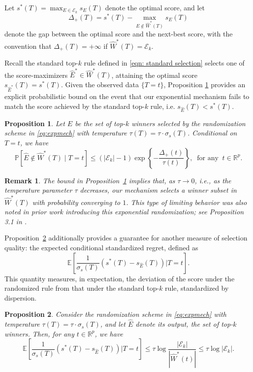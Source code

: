\documentclass[12pt]{article}
\newcommand{\rbracket}[1]{\left[ #1 \right]}
\newtheorem{proposition}{Proposition}[section]
\newtheorem{remark}{Remark}
\newcommand{\real}{\mathbb{R}}
\newcommand{\Pp}{{\mathbb{P}}}
\newcommand{\Ee}{{\mathbb{E}}}
\newcommand{\Ek}{\mathcal{E}_{k}}      %
\newcommand{\Ehat}{\widehat{E}}
\newcommand{\Eone}{\widehat{E}^*}  %
\newcommand{\Estar}{\widehat{W}^*}
\newcommand{\snoise}{\sigma_{s}}
\begin{document}
Let $s^*(T) = \displaystyle\max_{E \in \Ek} s_E(T)$ denote the optimal score, and let $$\Delta_+(T)=s^*(T) -
  \displaystyle\max_{E\notin \widehat{W}^*(T)}
  s_E(T)$$ 
denote the gap between the optimal score and the
next-best score, with the convention that $\Delta_+(T)=+\infty$ if $\widehat{W}^*(T)=\Ek$. 


Recall the standard top-$k$ rule defined in \eqref{eqn: standard selection} selects one of the score-maximizers $\Eone \in \widehat{W}^*(T)$, attaining the optimal score $s_{\Eone}(T) = s^*(T)$. 
Given the observed data $\{T=t\}$, Proposition \ref{prop:mismatch} provides an explicit probabilistic bound on the event that our exponential mechanism fails to match the score achieved by the standard top-$k$ rule, i.e. $s_{\Ehat} (T)<s^{*}(T)$.

\begin{proposition}
\label{prop:mismatch}
Let $\Ehat$ be the set of top-$k$ winners selected by the randomization scheme in \eqref{eq:expmech} with temperature $\tau(T) = \tau \cdot \snoise(T)$. 
Conditional on ${T=t}$, we have
\begin{equation*}
\label{eq:mismatch-simple-general}
\Pp\rbracket{\Ehat \notin \Estar(T)\mid T=t}
\le (|\Ek|-1) \exp\left\{-
\frac{\Delta_+(t)}{\tau(t)}
\right\}, \ \text{ for any } \ t\in \real^p.
\end{equation*}
\end{proposition}


\begin{remark}
The bound in Proposition~\ref{prop:mismatch} implies that, as $\tau\to 0$, i.e., as the temperature parameter $\tau$ decreases, our mechanism selects a winner subset in $\widehat{W}^*(T)$ with probability converging to $1$.
This type of limiting behavior was also noted in prior work introducing this exponential randomization; see Proposition 3.1 in \cite{bakshi2025classification}.
\end{remark}


Proposition~\ref{prop:regret} additionally provides a guarantee for another measure of selection quality: the expected conditional standardized regret, defined as
$$\Ee \left[\frac{1}{\snoise(T)}(s^*(T)-s_{\Ehat}(T)) \Big\lvert T=t\right].$$ 
This quantity measures, in expectation, the deviation of the score under the randomized rule from that under the standard top-$k$ rule, standardized by dispersion.
\begin{proposition}
\label{prop:regret}
Consider the randomization scheme in \eqref{eq:expmech} with temperature $\tau(T) = \tau \cdot \snoise(T)$, and let $\Ehat$ denote its output, the set of top-$k$ winners. 
Then, for any $t\in \real^p$, we have
\begin{equation*}
\label{eq:regret-bound}
\Ee\rbracket{\frac{1}{\snoise(T)} (s^*(T)-s_{\Ehat}(T))\Big\lvert T=t}
\le
\tau\log\frac{|\Ek|}{|\Estar(t)|}
\le
\tau\log|\Ek|.
\end{equation*} 
\end{proposition}
\end{document}
